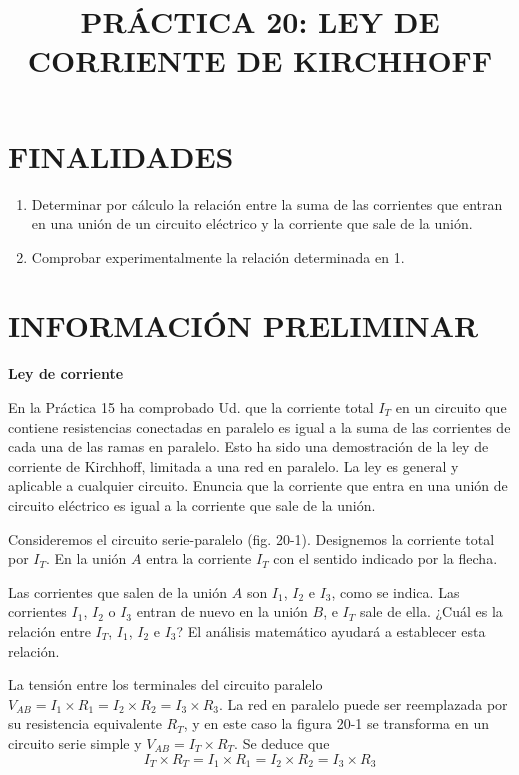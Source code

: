 \documentclass[12pt, a4paper]{article}
\begin{document}
\title{PRÁCTICA 20: LEY DE CORRIENTE DE KIRCHHOFF}
\date{}
\maketitle

\section*{FINALIDADES}
\begin{enumerate}
    \item Determinar por cálculo la relación entre la suma de las corrientes que entran en una unión de un circuito eléctrico y la corriente que sale de la unión.
    \item Comprobar experimentalmente la relación determinada en 1.
\end{enumerate}

\section*{INFORMACIÓN PRELIMINAR}
\textbf{Ley de corriente}

En la Práctica 15 ha comprobado Ud. que la corriente total \( I_T \) en un circuito que contiene resistencias conectadas en paralelo es igual a la suma de las corrientes de cada una de las ramas en paralelo. Esto ha sido una demostración de la ley de corriente de Kirchhoff, limitada a una red en paralelo. La ley es general y aplicable a cualquier circuito. Enuncia que la corriente que entra en una unión de circuito eléctrico es igual a la corriente que sale de la unión.

Consideremos el circuito serie-paralelo (fig. 20-1). Designemos la corriente total por \( I_T \). En la unión \( A \) entra la corriente \( I_T \) con el sentido indicado por la flecha.

Las corrientes que salen de la unión \( A \) son \( I_1 \), \( I_2 \) e \( I_3 \), como se indica. Las corrientes \( I_1 \), \( I_2 \) o \( I_3 \) entran de nuevo en la unión \( B \), e \( I_T \) sale de ella. ¿Cuál es la relación entre \( I_T \), \( I_1 \), \( I_2 \) e \( I_3 \)? El análisis matemático ayudará a establecer esta relación.

La tensión entre los terminales del circuito paralelo \( V_{AB} = I_1 \times R_1 = I_2 \times R_2 = I_3 \times R_3 \). La red en paralelo puede ser reemplazada por su resistencia equivalente \( R_T \), y en este caso la figura 20-1 se transforma en un circuito serie simple y \( V_{AB} = I_T \times R_T \). Se deduce que
\[
    I_T \times R_T = I_1 \times R_1 = I_2 \times R_2 = I_3 \times R_3
    \tag{20-1}
\]
\end{document}
